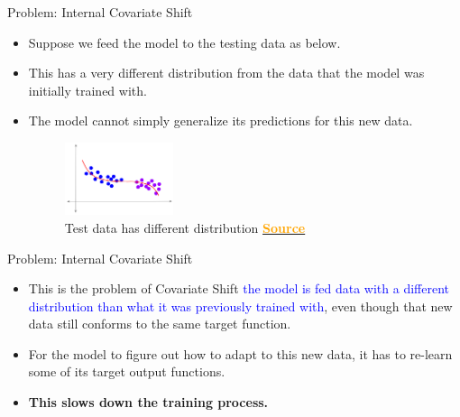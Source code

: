 \documentclass[serif, aspectratio=169]{beamer}
\begin{document}
\begin{frame}{Problem: Internal Covariate Shift}

\begin{itemize}

    \item Suppose we feed the model to the testing data as below.
    \item This has a very different distribution from the data that the model was initially trained with.
    \item The model cannot simply generalize its predictions for this new data.

    \begin{figure}
        \includegraphics[width=0.3\textwidth]{pic/ICS-4.png}
        \caption{Test data has different distribution \href{https://ketanhdoshi.github.io/assets/images/BatchNorm/ICS-4.png}{\textcolor{orange}{\textbf{Source}}}}
        \label{fig:Test_data_distribution}
    \end{figure}

\end{itemize}

\end{frame}

\begin{frame}{Problem: Internal Covariate Shift}
    
\begin{itemize}
    \item This is the problem of Covariate Shift \textcolor{blue}{the model is fed data with a different distribution than what it was previously trained with}, even though that new data still conforms to the same target function.

    \item For the model to figure out how to adapt to this new data, it has to re-learn some of its target output functions.
    \item \textbf{This slows down the training process.}
    
\end{itemize}

\end{frame}
\end{document}
